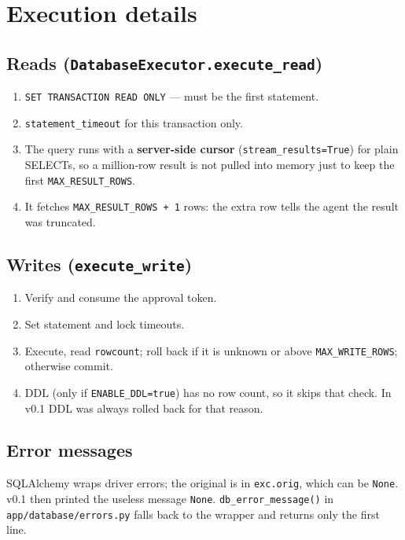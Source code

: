 \documentclass[11pt,a4paper]{article}
\begin{document}
\section{Execution details}

\subsection*{Reads (\texttt{DatabaseExecutor.execute\_read})}
\begin{enumerate}[leftmargin=*]
  \item \texttt{SET TRANSACTION READ ONLY} --- must be the first statement.
  \item \texttt{statement\_timeout} for this transaction only.
  \item The query runs with a \textbf{server-side cursor}
        (\texttt{stream\_results=True}) for plain SELECTs, so a million-row
        result is not pulled into memory just to keep the first
        \texttt{MAX\_RESULT\_ROWS}.
  \item It fetches \texttt{MAX\_RESULT\_ROWS + 1} rows: the extra row tells the
        agent the result was truncated.
\end{enumerate}

\subsection*{Writes (\texttt{execute\_write})}
\begin{enumerate}[leftmargin=*]
  \item Verify and consume the approval token.
  \item Set statement and lock timeouts.
  \item Execute, read \texttt{rowcount}; roll back if it is unknown or above
        \texttt{MAX\_WRITE\_ROWS}; otherwise commit.
  \item DDL (only if \texttt{ENABLE\_DDL=true}) has no row count, so it skips
        that check. In v0.1 DDL was always rolled back for that reason.
\end{enumerate}

\subsection*{Error messages}
SQLAlchemy wraps driver errors; the original is in \texttt{exc.orig}, which can
be \texttt{None}. v0.1 then printed the useless message \texttt{None}.
\texttt{db\_error\_message()} in \texttt{app/database/errors.py} falls back to
the wrapper and returns only the first line.
\end{document}
